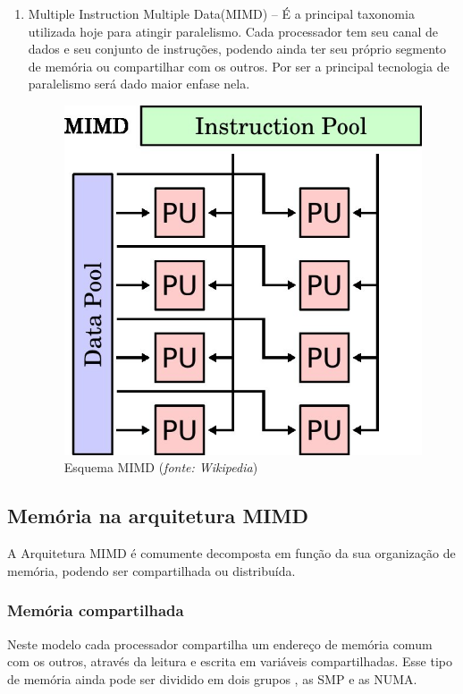\documentclass[a4paper]{article}
\begin{document}
\begin{enumerate}
\item {Multiple Instruction Multiple Data(MIMD) – É a principal taxonomia utilizada hoje para atingir paralelismo. Cada processador tem seu canal de dados e seu conjunto de instruções, podendo ainda ter seu próprio segmento de memória ou compartilhar com os outros. Por ser a principal tecnologia de paralelismo será dado maior enfase nela.
\begin{figure}[h]
\centering
\includegraphics[scale=0.5]{MIMD}
\caption{Esquema MIMD (\textit{fonte: Wikipedia})}
\end{figure}}
\end{enumerate}

\subsection{Memória na arquitetura MIMD}

A Arquitetura MIMD é comumente decomposta em função da sua organização de memória, podendo ser compartilhada ou distribuída.

\subsubsection{Memória compartilhada}

Neste modelo cada processador compartilha um endereço de memória comum com os outros, através da leitura e escrita em variáveis compartilhadas. Esse tipo de memória ainda pode ser dividido em dois grupos , as SMP e as NUMA.
\end{document}
